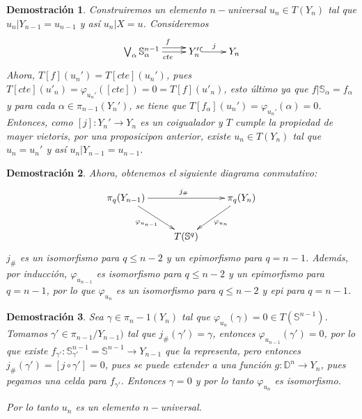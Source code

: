 \documentclass{beamer}
\newtheorem{dem}{Demostraci\'on}
\begin{document}
\begin{frame}
	\begin{dem}
		Construiremos un elemento $n-$universal $u_n \in T(Y_n)$ tal que $u_n | Y_{n-1}=u_{n-1}$ y así $u_n|X=u$. Consideremos
		\[\xymatrix{\bigvee_\alpha \mathbb{S}_\alpha^{n-1} \ar@<1ex>[r]^{f}\ar[r]_{cte} & Y_n'\ar@{^{(}->}[r]^j  & Y_n}\]
		Ahora, $T[f](u_n')=T[cte](u_n')$, pues $T[cte](u'_n)=\varphi_{u_n'}([cte])=0=T[f](u'_n)$, esto último ya que $f|\mathbb{S}_\alpha=f_\alpha$ y para cada $\alpha\in\pi_{n-1}(Y_n')$, se tiene que $T[f_\alpha](u_n')=\varphi_{u_n'}(\alpha)=0$. Entonces, como $[j]\colon Y_n' \to Y_n$ es un coigualador y $T$ cumple la propiedad de mayer vietoris, por una proposicipon anterior, existe $u_n\in T(Y_n)$ tal que $u_n=u_n'$ y así $u_n |Y_{n-1}=u_{n-1}$.
		
	\end{dem}
\end{frame}

\begin{frame}
	\begin{dem}
		Ahora, obtenemos el siguiente diagrama conmutativo:
		\[\xymatrix{
			\pi_q (Y_{n-1})\ar[rr]^{j_\#} \ar[rd]_{\varphi_{u_{n-1}}} && \pi_q(Y_n)\ar[ld]^{\varphi_{u_n}}\\
			& T(\mathbb{S}^q) & 		
		}\]
		$j_\#$ es un isomorfismo para $q\leq n-2$ y un epimorfismo para $q=n-1$. Además, por inducción, $\varphi_{u_{n-1}}$ es isomorfismo para $q\leq n-2$ y un epimorfismo para $q=n-1$, por lo que $\varphi_{u_n}$ es un isomorfismo para $q\leq n-2$ y epi para $q=n-1$. 
	\end{dem}
\end{frame}

\begin{frame}
	\begin{dem}
		Sea $\gamma\in\pi_n-1(Y_n)$ tal que $\varphi_{u_n}(\gamma)=0\in T(\mathbb{S}^{n-1})$. Tomamos $\gamma'\in\pi_{n-1}/Y_{n-1})$ tal que $j_\#(\gamma')=\gamma$, entonces $\varphi_{u_{n-1}}(\gamma')=0$, por lo que existe $f_{\gamma'}\colon \mathbb{S}_{\gamma'}^{n-1}=\mathbb{S}^{n-1}\to Y_{n-1}$ que la representa, pero entonces $j_\# (\gamma')=[j\circ\gamma']=0$, pues se puede extender a una función $g\colon \mathbb{D}^{n}\to Y_{n}$, pues pegamos una celda para $f_{\gamma'}$. Entonces $\gamma=0$ y por lo tanto $\varphi_{u_n}$ es isomorfismo.
		
		Por lo tanto $u_n$ es un elemento $n-$universal.
	\end{dem}
\end{frame}
\end{document}
